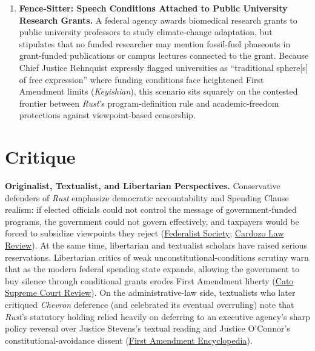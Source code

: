 \documentclass[12pt]{article}
\begin{document}
\begin{enumerate}
\item \textbf{Fence-Sitter: Speech Conditions Attached to Public University Research Grants.} A federal agency awards biomedical research grants to public university professors to study climate-change adaptation, but stipulates that no funded researcher may mention fossil-fuel phaseouts in grant-funded publications or campus lectures connected to the grant. Because Chief Justice Rehnquist expressly flagged universities as ``traditional sphere[s] of free expression'' where funding conditions face heightened First Amendment limits (\textit{Keyishian}), this scenario sits squarely on the contested frontier between \textit{Rust}'s program-definition rule and academic-freedom protections against viewpoint-based censorship.
\end{enumerate}

\section{Critique}

\textbf{Originalist, Textualist, and Libertarian Perspectives.} Conservative defenders of \textit{Rust} emphasize democratic accountability and Spending Clause realism: if elected officials could not control the message of government-funded programs, the government could not govern effectively, and taxpayers would be forced to subsidize viewpoints they reject (\href{https://fedsoc.org/case/rust-v-sullivan}{Federalist Society}; \href{https://www.cardozolawreview.com/the-end-of-government-speech/}{Cardozo Law Review}). At the same time, libertarian and textualist scholars have raised serious reservations. Libertarian critics of weak unconstitutional-conditions scrutiny warn that as the modern federal spending state expands, allowing the government to buy silence through conditional grants erodes First Amendment liberty (\href{https://www.cato.org/supreme-court-review/2005-2006/unanimously-wrong}{Cato Supreme Court Review}). On the administrative-law side, textualists who later critiqued \textit{Chevron} deference (and celebrated its eventual overruling) note that \textit{Rust}'s statutory holding relied heavily on deferring to an executive agency's sharp policy reversal over Justice Stevens's textual reading and Justice O'Connor's constitutional-avoidance dissent (\href{https://firstamendment.mtsu.edu/article/rust-v-sullivan/}{First Amendment Encyclopedia}).
\end{document}

